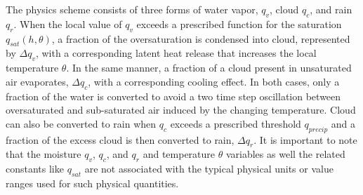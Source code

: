 \documentclass{ametsoc}
\begin{document}
   The \cite{zerroukat2015moist} physics scheme consists of three forms of water vapor, 
$q_v$, cloud $q_c$, and rain $q_r$.  When the local value of $q_v$ exceeds a 
prescribed function for the saturation $q_{sat}(h, \theta)$, a fraction of the 
oversaturation is condensed into cloud, represented by $\Delta q_v$, with a corresponding latent 
heat release that increases the local temperature $\theta$. In the same manner, 
a fraction of a cloud present in unsaturated air evaporates, $\Delta q_c$, 
with a corresponding cooling effect. In both cases, only a fraction of the water is 
converted to avoid a two time step oscillation between oversaturated and sub-saturated 
air induced by the changing temperature. Cloud can also be converted to rain when $q_c$ 
exceeds a prescribed threshold $q_{precip}$ and a fraction of the excess cloud is then 
converted to rain, $\Delta q_r$. It is important to note that
the moisture $q_v$, $q_c$, and $q_r$ and temperature $\theta$ variables as well the 
related constants like $q_{sat}$ are not associated with the 
typical physical units or value ranges used for
such physical quantities.
\end{document}
